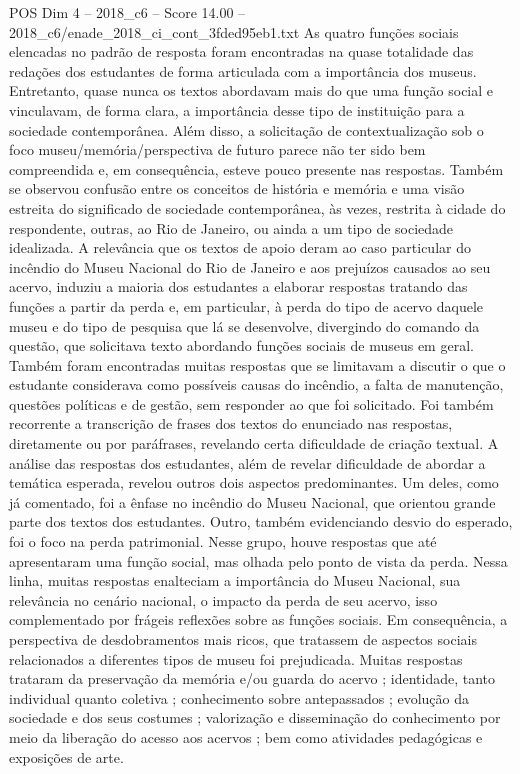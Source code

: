 \begin{textsample}{POS Dim 4 – 2018\_c6 – Score 14.00 – 2018\_c6/enade\_2018\_ci\_cont\_3fded95eb1.txt}
As quatro funções sociais elencadas no padrão de resposta foram encontradas na quase totalidade das redações dos estudantes de forma articulada com a importância dos museus.
Entretanto, quase nunca os textos abordavam mais do que uma função social e vinculavam, de forma clara, a importância desse tipo de instituição para a sociedade contemporânea.
Além disso, a solicitação de contextualização sob o foco museu/memória/perspectiva de futuro parece não ter sido bem compreendida e, em consequência, esteve pouco presente nas respostas.
Também se observou confusão entre os conceitos de história e memória e uma visão estreita do significado de sociedade contemporânea, às vezes, restrita à cidade do respondente, outras, ao Rio de Janeiro, ou ainda a um tipo de sociedade idealizada.
A relevância que os textos de apoio deram ao caso particular do incêndio do Museu Nacional do Rio de Janeiro e aos prejuízos causados ao seu acervo, induziu a maioria dos estudantes a elaborar respostas tratando das funções a partir da perda e, em particular, à perda do tipo de acervo daquele museu e do tipo de pesquisa que lá se desenvolve, divergindo do comando da questão, que solicitava texto abordando funções sociais de museus em geral.
Também foram encontradas muitas respostas que se limitavam a discutir o que o estudante considerava como possíveis causas do incêndio, a falta de manutenção, questões políticas e de gestão, sem responder ao que foi solicitado.
Foi também recorrente a transcrição de frases dos textos do enunciado nas respostas, diretamente ou por paráfrases, revelando certa dificuldade de criação textual.
A análise das respostas dos estudantes, além de revelar dificuldade de abordar a temática esperada, revelou outros dois aspectos predominantes.
Um deles, como já comentado, foi a ênfase no incêndio do Museu Nacional, que orientou grande parte dos textos dos estudantes.
Outro, também evidenciando desvio do esperado, foi o foco na perda patrimonial.
Nesse grupo, houve respostas que até apresentaram uma função social, mas olhada pelo ponto de vista da perda.
Nessa linha, muitas respostas enalteciam a importância do Museu Nacional, sua relevância no cenário nacional, o impacto da perda de seu acervo, isso complementado por frágeis reflexões sobre as funções sociais.
Em consequência, a perspectiva de desdobramentos mais ricos, que tratassem de aspectos sociais relacionados a diferentes tipos de museu foi prejudicada.
Muitas respostas trataram da preservação da memória e/ou guarda do acervo ; identidade, tanto individual quanto coletiva ; conhecimento sobre antepassados ; evolução da sociedade e dos seus costumes ; valorização e disseminação do conhecimento por meio da liberação do acesso aos acervos ; bem como atividades pedagógicas e exposições de arte.

\end{textsample}

